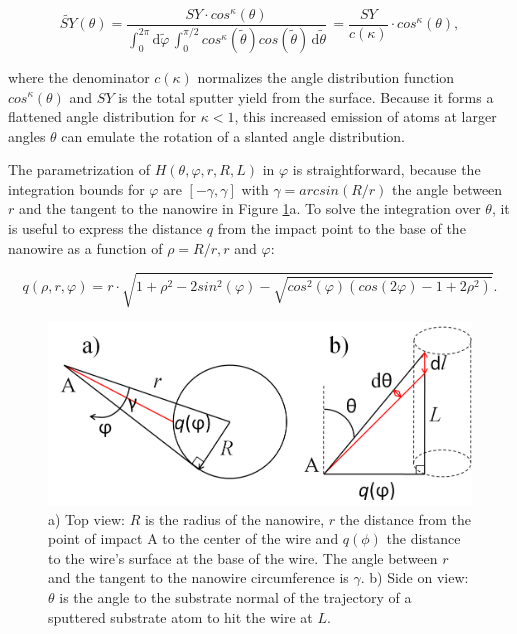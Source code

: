 \begin{equation}
\tilde{SY}(\theta) = \frac{SY \cdot cos^\kappa(\theta)}{\int_0^{2\pi} \! \mathrm{d}\tilde\varphi \,\int_0^{\pi/2} \! cos^\kappa(\tilde\theta) cos(\tilde\theta)\,  \mathrm{d}\tilde\theta} \, = \frac{SY}{c(\kappa)} \cdot cos^\kappa(\theta) ,
\end{equation}

where the denominator $c(\kappa)$ normalizes the angle distribution function $cos^\kappa(\theta)$ and $SY$ is the total sputter yield from the surface. Because it forms a flattened angle distribution for $\kappa < 1$, this increased emission of atoms at larger angles $\theta$ can emulate the rotation of a slanted angle distribution.

The parametrization of $H(\theta,\varphi,r,R,L)$ in $\varphi$ is straightforward, because the integration bounds for $\varphi$ are $[-\gamma, \gamma]$ with $\gamma = arcsin(R/r)$ the angle between $r$ and the tangent to the nanowire in Figure \ref{anglesredepo}a. To solve the integration over $\theta$, it is useful to express the distance $q$ from the impact point to the base of the nanowire as a function of $\rho = R/r, r$ and $\varphi$:

\begin{equation}
q(\rho,r,\varphi) = r\cdot \sqrt{1 + \rho^2 - 2sin^2(\varphi) - \sqrt{cos^2(\varphi)(cos(2\varphi) - 1 + 2\rho^2)}}.
\end{equation}

\begin{figure}
	\centering
		\includegraphics[width=.7\textwidth]{images/anglesredeposition.jpg}
	\caption{a) Top view: $R$ is the radius of the nanowire, $r$ the distance from the point of impact A to the center of the wire and $q(\phi)$ the distance to the wire's surface at the base of the wire. The angle between $r$ and the tangent to the nanowire circumference is $\gamma$. b) Side on view: $\theta$ is the angle to the substrate normal of the trajectory of a sputtered substrate atom to hit the wire at $L$.} 
	\label{anglesredepo}
\end{figure} 

